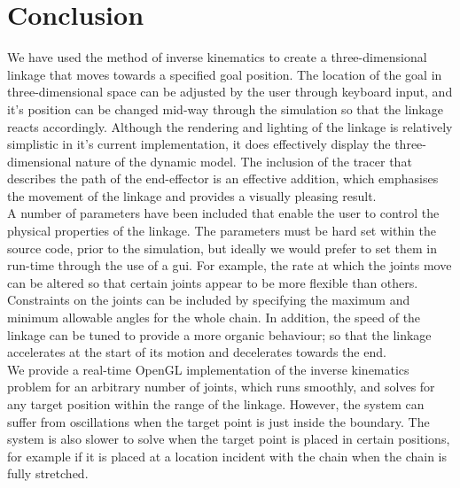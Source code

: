 \documentclass[paper=a4, fontsize=11pt]{scrartcl} %
\numberwithin{equation}{section} %
\numberwithin{figure}{section} %
\numberwithin{table}{section} %
\begin{document}
  
\section{Conclusion}

We have used the method of inverse kinematics to create a three-dimensional linkage that moves towards a specified goal position. The location of the goal in three-dimensional space can be adjusted by the user through keyboard input, and it's position can be changed mid-way through the simulation so that the linkage reacts accordingly. Although the rendering and lighting of the linkage is relatively simplistic in it's current implementation, it does effectively display the three-dimensional nature of the dynamic model. The inclusion of the tracer that describes the path of the end-effector is an effective addition, which emphasises the movement of the linkage and provides a visually pleasing result. \\

A number of parameters have been included that enable the user to control the physical properties of the linkage. The parameters must be hard set within the source code, prior to the simulation, but ideally we would prefer to set them in run-time through the use of a gui. For example, the rate at which the joints move can be altered so that certain joints appear to be more flexible than others. Constraints on the joints can be included by specifying the maximum and minimum allowable angles for the whole chain. In addition, the speed of the linkage can be tuned to provide a more organic behaviour; so that the linkage accelerates at the start of its motion and decelerates towards the end. \\

We provide a real-time OpenGL implementation of the inverse kinematics problem for an arbitrary number of joints, which runs smoothly, and solves for any target position within the range of the linkage. However, the system can suffer from oscillations when the target point is just inside the boundary. The system is also slower to solve when the target point is placed in certain positions, for example if it is placed at a location incident with the chain when the chain is fully stretched.
\end{document}
